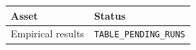 \begin{tabular}{ll}\toprule
Asset & Status \\\midrule
Empirical results & \texttt{TABLE\_PENDING\_RUNS} \\
\bottomrule\end{tabular}
